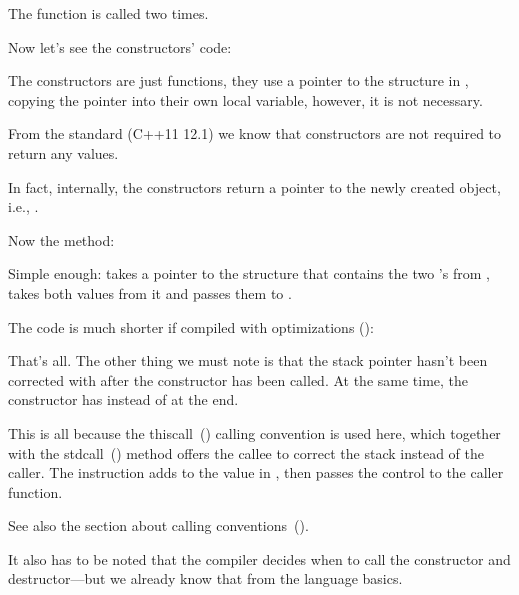 The  function is called two times.

Now let's see the constructors' code:



The constructors are just functions, they use a pointer to the structure in \ECX,
copying the pointer into their own local variable, however, it is not necessary.

From the \Cpp standard (C++11 12.1) we know that constructors are not required to return any values.

In fact, internally, the constructors return a pointer to the newly created object, i.e., \ITthis.

Now the  method:



Simple enough:  takes a pointer to the structure that contains the two \Tint's from \ECX,
takes both values from it and passes them to \printf.

The code is much shorter if compiled with optimizations (\Ox):




That's all. The other thing we must note is that the \gls{stack pointer} hasn't been corrected
with  after the constructor has been called. 
At the same time, the constructor has  instead of \RET at the end.


This is all because the thiscall~() calling convention is used here,
which together with the stdcall~() method offers the \gls{callee} to correct the stack
instead of the \gls{caller}.
The  instruction adds  to the value in \ESP, then passes the control to the \gls{caller} function.

See also the section about calling conventions~().

It also has to be noted that the compiler decides when to call the constructor and 
destructor---but we already know that from the \Cpp language basics.

\label{simple_CPP_MSVC_x64}


